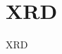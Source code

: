 \documentclass[\main/dresen_thesis.tex]{subfiles}
\begin{document}
  \section{XRD}
    \label{app:methods:xrd}
    XRD
\end{document}

